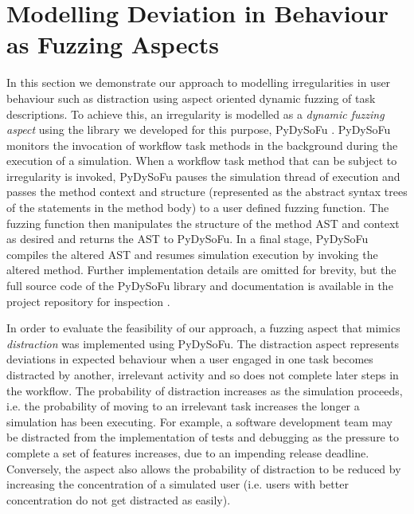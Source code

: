 \documentclass{llncs}
\begin{document}

\section{Modelling Deviation in Behaviour as Fuzzing Aspects}
\label{sec:fuzzing}


In this section we demonstrate our approach to modelling irregularities in user behaviour such as distraction using aspect
oriented dynamic fuzzing of task descriptions.  To achieve this, an irregularity is modelled as a \emph{dynamic fuzzing
  aspect} using the library we developed for this purpose, PyDySoFu \cite{storer2016pydysofu-scm}.  PyDySoFu monitors the
invocation of workflow task methods in the background during the execution of a simulation.  When a workflow task method
that can be subject to irregularity is invoked, PyDySoFu pauses the simulation thread of execution and passes the method
context and structure (represented as the abstract syntax trees of the statements in the method body) to a user defined
fuzzing function.  The fuzzing function then manipulates the structure of the method AST and context as desired and
returns the AST to PyDySoFu.  In a final stage, PyDySoFu compiles the altered AST and resumes simulation execution by
invoking the altered method.  Further implementation details are omitted for brevity, but the full source code of the
PyDySoFu library and documentation is available in the project repository for inspection \cite{storer2016pydysofu-scm}.

In order to evaluate the feasibility of our approach, a fuzzing aspect that mimics \emph{distraction} was implemented
using PyDySoFu.  The distraction aspect represents deviations in expected behaviour when a user engaged in one task
becomes distracted by another, irrelevant activity and so does not complete later steps in the workflow.  The probability
of distraction increases as the simulation proceeds, i.e. the probability of moving to an irrelevant task increases the
longer a simulation has been executing.  For example, a software development team may be distracted from the
implementation of tests and debugging as the pressure to complete a set of features increases, due to an impending
release deadline.  Conversely, the aspect also allows the probability of distraction to be reduced by increasing the
concentration of a simulated user (i.e. users with better concentration do not get distracted as easily).
\end{document}

